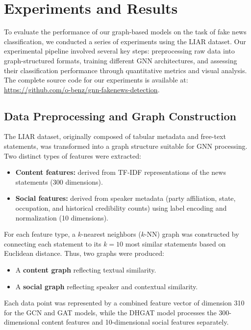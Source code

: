\section{Experiments and Results}

To evaluate the performance of our graph-based models on the task of fake news classification, we conducted a series of experiments using the LIAR dataset. Our experimental pipeline involved several key steps: preprocessing raw data into graph-structured formats, training different GNN architectures, and assessing their classification performance through quantitative metrics and visual analysis.  
The complete source code for our experiments is available at: \url{https://github.com/o-benz/gnn-fakenews-detection}.

\subsection{Data Preprocessing and Graph Construction}

The LIAR dataset, originally composed of tabular metadata and free-text statements, was transformed into a graph structure suitable for GNN processing. Two distinct types of features were extracted:

\begin{itemize}
    \item \textbf{Content features:} derived from TF-IDF representations of the news statements (300 dimensions).
    \item \textbf{Social features:} derived from speaker metadata (party affiliation, state, occupation, and historical credibility counts) using label encoding and normalization (10 dimensions).
\end{itemize}

For each feature type, a $k$-nearest neighbors ($k$-NN) graph was constructed by connecting each statement to its $k=10$ most similar statements based on Euclidean distance. Thus, two graphs were produced:
\begin{itemize}
    \item A \textbf{content graph} reflecting textual similarity.
    \item A \textbf{social graph} reflecting speaker and contextual similarity.
\end{itemize}

Each data point was represented by a combined feature vector of dimension 310 for the GCN and GAT models, while the DHGAT model processes the 300-dimensional content features and 10-dimensional social features separately.

